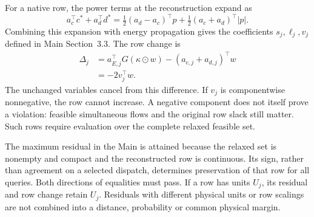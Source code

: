 For a native row, the power terms at the reconstruction expand as
\begin{equation}
a_c^\top c^*+a_d^\top d^*
=\tfrac 12(a_d-a_c)^\top p+\tfrac 12(a_c+a_d)^\top|p| .
\label{eq:power_row}
\end{equation}
Combining this expansion with energy propagation gives the coefficients
$s_j,\ell_j,v_j$ defined in Main Section~3.3. The row change is
\begin{align}
\Delta_j
&=a_{E, j}^\top G(\kappa\odot w)
 -(a_{c, j}+a_{d, j})^\top w\\
&=-2v_j^\top w .\label{eq:row_change}
\end{align}
The unchanged variables cancel from this difference. If $v_j$ is
componentwise nonnegative, the row cannot increase. A negative component
does not itself prove a violation: feasible simultaneous flows and the
original row slack still matter. Such rows require evaluation over the
complete relaxed feasible set.

The maximum residual in the Main is attained because the relaxed set is
nonempty and compact and the reconstructed row is continuous. Its sign,
rather than agreement on a selected dispatch, determines preservation of
that row for all queries. Both directions of equalities must pass. If a row
has units $U_j$, its residual and row change retain $U_j$. Residuals with
different physical units or row scalings are not combined into a distance,
probability or common physical margin.

